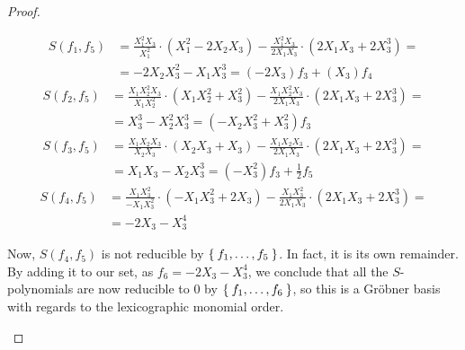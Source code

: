 \begin{proof}
\begin{itemize}
    \begin{align*}
        S(f_1, f_5) &= \frac{X_1^2 X_3}{X_1^2} \cdot (X_1^2 - 2 X_2 X_3) - \frac{X_1^2 X_3}{2 X_1 X_3} \cdot (2 X_1 X_3 + 2 X_3^3) = \\
        &= - 2 X_2 X_3^2 - X_1 X_3^3 = (-2 X_3) f_3 + (X_3) f_4
    \end{align*}
    \begin{align*}
        S(f_2, f_5) &= \frac{X_1 X_2^2 X_3}{X_1 X_2^2} \cdot (X_1 X_2^2 + X_3^2) - \frac{X_1 X_2^2 X_3}{2 X_1 X_3} \cdot (2 X_1 X_3 + 2 X_3^3) = \\
        &= X_3^3 - X_2^2 X_3^3 = (- X_2 X_3^2 + X_3^2) f_3
    \end{align*}
    \begin{align*}
        S(f_3, f_5) &= \frac{X_1 X_2 X_3}{X_2 X_3} \cdot (X_2 X_3 + X_3) - \frac{X_1 X_2 X_3}{2 X_1 X_3} \cdot (2 X_1 X_3 + 2 X_3^3) = \\
        &= X_1 X_3 - X_2 X_3^3 = (-X_3^2) f_3 + \frac{1}{2} f_5
    \end{align*}
    \begin{align*}
        S(f_4, f_5) &= \frac{X_1 X_3^2}{- X_1 X_3^2} \cdot (- X_1 X_3^2 + 2 X_3) - \frac{X_1 X_3^2}{2 X_1 X_3} \cdot (2 X_1 X_3 + 2 X_3^3) = \\
        &= - 2 X_3 - X_3^4
    \end{align*}
    
    Now, \(S(f_4, f_5)\) is not reducible by \(\Set{f_1, \dots, f_5}\). In fact, it is its own remainder. By adding it to our set, as \(f_6 = -2 X_3 - X_3^4\), we conclude that all the \(S\)-polynomials are now reducible to \(0\) by \(\Set{ f_1, \dots, f_6 }\), so this is a Gröbner basis with regards to the lexicographic monomial order.


\end{itemize}
\end{proof}
